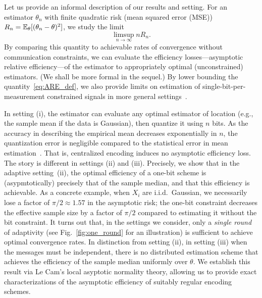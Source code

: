 Let us provide an informal description of our results and setting. For an
estimator $\theta_n$ with finite quadratic risk (mean squared error (MSE)) $R_n =
\mathbb{E}_\theta[(\theta_n - \theta)^2]$, we study the limit
\begin{equation}
  \label{eq:ARE_def}
  \limsup_{n\to \infty} n R_n.
\end{equation}
By comparing this quantity to achievable rates of convergence without
communication constraints, we can evaluate the efficiency
losses---asymptotic relative efficiency---of the estimator to appropriately
optimal (unconstrained) estimators. (We shall be more formal in the sequel.)
By lower bounding the quantity~\eqref{eq:ARE_def}, we also provide limits on
estimation of single-bit-per-measurement constrained signals in more general
settings~\cite{baraniuk2017exponential, jacques2013robust, plan2013one,
  li2017channel, choi2016near}.


In setting (i), the estimator can evaluate any optimal estimator of location
(e.g., the sample mean if the data is Gaussian), then quantize it using
$n$ bits. As the accuracy in describing the empirical mean decreases
exponentially in $n$, the quantization error is negligible compared
to the statistical error in mean estimation~\cite{720540}. That is,
centralized encoding induces no asymptotic efficiency loss.
%
The story is different in settings (ii) and (iii). Precisely, we show that
in the adaptive setting~(ii), the optimal efficiency of a one-bit scheme is
(asypmtotically) precisely that of the sample median, and that this
efficiency is achievable. As a concrete example, when $X_i$ are
i.i.d.\ Gaussian, we necessarily lose a factor of $\pi/2 \approx 1.57$ in
the asymptotic risk; the one-bit constraint decreases the effective sample
size by a factor of $\pi/2$ compared to estimating it without the bit
constraint. It turns out that, in the settings we consider,
only a \emph{single round} of adaptivity (see Fig.~\ref{fig:one_round} for
an illustration) is sufficient to achieve optimal convergence rates.
%
In distinction from setting (ii), in setting (iii) when the messages must be
independent, there is no distributed estimation scheme that achieves the
efficiency of the sample median uniformly over $\theta$.  We establish this
result via Le Cam's local asyptotic normality theory, allowing us
to provide exact characterizations of the asymptotic efficiency
of suitably regular encoding schemes.

